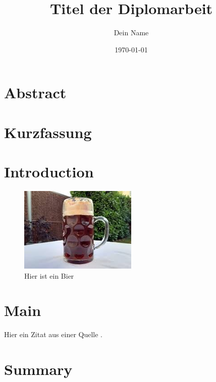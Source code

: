 \documentclass[a4paper,12pt]{report}
\begin{document}
\title{Titel der Diplomarbeit}
\author{Dein Name}
\date{\today}
\maketitle

\chapter*{Abstract}
\lipsum[1]
\newpage

\chapter*{Kurzfassung}
\lipsum[1]
\newpage

\tableofcontents
\newpage

\chapter{Introduction}
\lipsum[1]


\begin{figure}[h!]
    \centering
    \includegraphics[width=0.5\textwidth]{beispiel.jpg}
    \caption{Hier ist ein Bier}
    \label{fig:beispielbild}
\end{figure}

\chapter{Main}
\lipsum[1]

Hier ein Zitat aus einer Quelle \cite{author2023example}.

\chapter{Summary}
\lipsum[1]

\printbibliography

\listoffigures
\newpage
\end{document}
